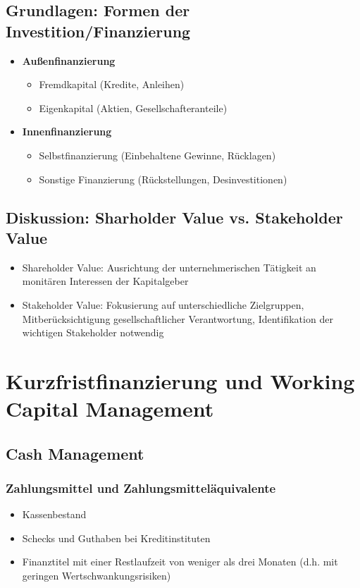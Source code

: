 \subsection{Grundlagen: Formen der Investition/Finanzierung}
\begin{itemize}
	\item \textbf{Außenfinanzierung}
	\begin{itemize}
		\item Fremdkapital (Kredite, Anleihen)
		\item Eigenkapital (Aktien, Gesellschafteranteile)
	\end{itemize}
	\item \textbf{Innenfinanzierung}
	\begin{itemize}
		\item Selbstfinanzierung (Einbehaltene Gewinne, Rücklagen)
		\item Sonstige Finanzierung (Rückstellungen, Desinvestitionen)
	\end{itemize}
\end{itemize}


\subsection{Diskussion: Sharholder Value vs. Stakeholder Value}
\begin{itemize}
	\item Shareholder Value: Ausrichtung der unternehmerischen Tätigkeit an monitären Interessen der Kapitalgeber
	\item Stakeholder Value: Fokusierung auf unterschiedliche Zielgruppen, Mitberücksichtigung gesellschaftlicher Verantwortung, Identifikation der wichtigen Stakeholder notwendig
\end{itemize}



\section{Kurzfristfinanzierung und Working Capital Management}

\subsection{Cash Management}

\subsubsection{Zahlungsmittel und Zahlungsmitteläquivalente}
\begin{itemize}
	\item Kassenbestand
	\item Schecks und Guthaben bei Kreditinstituten
	\item Finanztitel mit einer Restlaufzeit von weniger als drei Monaten (d.h. mit geringen Wertschwankungsrisiken)
\end{itemize}

